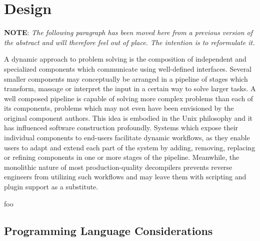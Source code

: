 
\section{Design}


\textbf{NOTE}: \textit{The following paragraph has been moved here from a previous version of the abstract and will therefore feel out of place. The intention is to reformulate it.}

A dynamic approach to problem solving is the composition of independent and specialized components which communicate using well-defined interfaces. Several smaller components may conceptually be arranged in a pipeline of stages which transform, massage or interpret the input in a certain way to solve larger tasks. A well composed pipeline is capable of solving more complex problems than each of its components, problems which may not even have been envisioned by the original component authors. This idea is embodied in the Unix philosophy and it has influenced software construction profoundly. Systems which expose their individual components to end-users facilitate dynamic workflows, as they enable users to adapt and extend each part of the system by adding, removing, replacing or refining components in one or more stages of the pipeline. Meanwhile, the monolithic nature of most production-quality decompilers prevents reverse engineers from utilizing such workflows and may leave them with scripting and plugin support as a substitute.

%


foo


\subsection{Programming Language Considerations}

